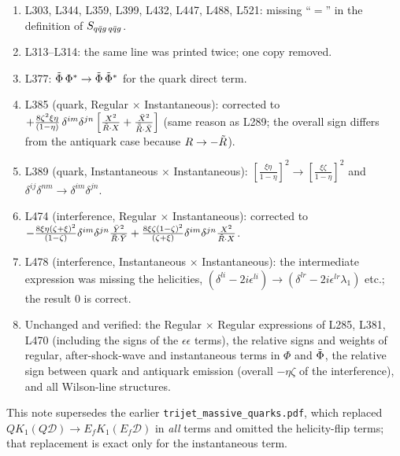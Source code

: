 \documentclass[9pt]{article}
\newcommand{\Ef}{E_{f}}                      %
\numberwithin{equation}{section}
\begin{document}
\begin{enumerate}
    \item L303, L344, L359, L399, L432, L447, L488, L521: missing ``$=$'' in the definition of $S_{q\Bar{q}g\,q\Bar{q}g}$.
    \item L313--L314: the same line was printed twice; one copy removed.
    \item L377: $\Tilde{\Phi}\,\Phi^{*}\rightarrow\Tilde{\Phi}\,\Tilde{\Phi}^{*}$ for the quark direct term.
    \item L385 (quark, Regular $\times$ Instantaneous): corrected to $+\frac{8\zeta^{2}\xi\eta}{(1-\eta)}\,\delta^{im}\delta^{jn}\left[\frac{X^{2}}{\Tilde{R}\cdot X}+\frac{\Bar{X}^{2}}{\Bar{\Tilde{R}}\cdot\Bar{X}}\right]$ (same reason as L289; the overall sign differs from the antiquark case because $R\rightarrow-\Tilde{R}$).
    \item L389 (quark, Instantaneous $\times$ Instantaneous): $\left[\frac{\xi\eta}{1-\eta}\right]^{2}\rightarrow\left[\frac{\xi\zeta}{1-\eta}\right]^{2}$ and $\delta^{ij}\delta^{nm}\rightarrow\delta^{im}\delta^{jn}$.
    \item L474 (interference, Regular $\times$ Instantaneous): corrected to $-\frac{8\xi\eta(\zeta+\xi)^{2}}{(1-\zeta)}\delta^{im}\delta^{jn}\frac{\Bar{Y}^{2}}{\Bar{R}\cdot\Bar{Y}}+\frac{8\xi\zeta(1-\zeta)^{2}}{(\zeta+\xi)}\delta^{im}\delta^{jn}\frac{X^{2}}{\Tilde{R}\cdot X}$.
    \item L478 (interference, Instantaneous $\times$ Instantaneous): the intermediate expression was missing the helicities, $(\delta^{li}-2i\epsilon^{li})\rightarrow(\delta^{lr}-2i\epsilon^{lr}\lambda_{1})$ etc.; the result $0$ is correct.
    \item Unchanged and verified: the Regular $\times$ Regular expressions of L285, L381, L470 (including the signs of the $\epsilon\epsilon$ terms), the relative signs and weights of regular, after-shock-wave and instantaneous terms in $\Phi$ and $\Tilde{\Phi}$, the relative sign between quark and antiquark emission (overall $-\eta\zeta$ of the interference), and all Wilson-line structures.
\end{enumerate}
This note supersedes the earlier \texttt{trijet\_massive\_quarks.pdf}, which replaced $Q K_{1}(Q\mathcal{D})\rightarrow\Ef K_{1}(\Ef\mathcal{D})$ in \emph{all} terms and omitted the helicity-flip terms; that replacement is exact only for the instantaneous term.
\end{document}
